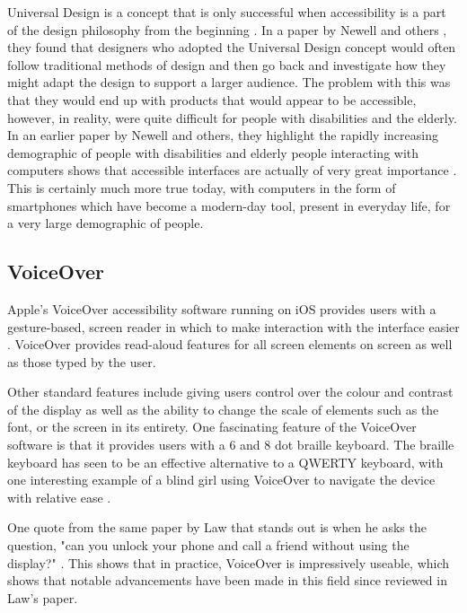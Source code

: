 Universal Design is a concept that is only successful when accessibility is a part of the design philosophy from the beginning \cite{incldesign}.
In a paper by Newell and others \cite{incldesign}, they found that designers who adopted the Universal Design concept would often follow traditional methods of design and then go back and investigate how they might adapt the design to support a larger audience.
The problem with this was that they would end up with products that would appear to be accessible, however, in reality, were quite difficult for people with disabilities and the elderly.
In an earlier paper by Newell and others, they highlight the rapidly increasing demographic of people with disabilities and elderly people interacting with computers shows that accessible interfaces are actually of very great importance \cite{computerinterface}.
This is certainly much more true today, with computers in the form of smartphones which have become a modern-day tool, present in everyday life, for a very large demographic of people.


\subsection{VoiceOver}
Apple's VoiceOver accessibility software running on iOS provides users with a gesture-based, screen reader in which to make interaction with the interface easier \cite{iphone}.
VoiceOver provides read-aloud features for all screen elements on screen as well as those typed by the user.

Other standard features include giving users control over the colour and contrast of the display as well as the ability to change the scale of elements such as the font, or the screen in its entirety.
One fascinating feature of the VoiceOver software is that it provides users with a 6 and 8 dot braille keyboard. 
The braille keyboard has seen to be an effective alternative to a QWERTY keyboard, with one interesting example of a blind girl using VoiceOver to navigate the device with relative ease \cite{blind}. %

One quote from the same paper by Law that stands out is when he asks the question, "can you unlock your phone and call a friend without using the display?" \cite{cellphone}.
This shows that in practice, VoiceOver is impressively useable, which shows that notable advancements have been made in this field since reviewed in Law's paper.

